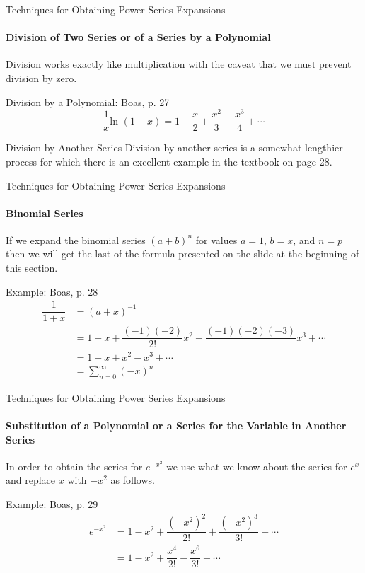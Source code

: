 \documentclass{beamer}
\begin{document}
\begin{frame}{Techniques for Obtaining Power Series Expansions}
    	\framesubtitle{Division of Two Series or of a Series by a Polynomial}
	Division works exactly like multiplication with the caveat that we must prevent division by zero.
    	\begin{exampleblock}{Division by a Polynomial: Boas, p. 27}
	\[ \dfrac{1}{x}\mbox{ln\ }(1+x) = 1 - \dfrac{x}{2} + \dfrac{x^{2}}{3} - \dfrac{x^{3}}{4} + \cdots \]
	\end{exampleblock}
	\begin{block}{Division by Another Series}
    	Division by another series is a somewhat lengthier process for which there is an excellent example in the textbook on page 28.
	\end{block}
\end{frame}
  
\begin{frame}{Techniques for Obtaining Power Series Expansions}
    	\framesubtitle{Binomial Series}
	If we expand the binomial series $(a+b)^{n}$ for values $a=1$, $b=x$, and $n=p$ then we will get the last of the formula presented on the slide at the beginning of this section.
	\begin{exampleblock}{Example: Boas, p. 28}
	\begin{align*}
	\dfrac{1}{1+x} &= (a+x)^{-1} \\
	&= 1-x+\dfrac{(-1)(-2)}{2!}x^{2}+\dfrac{(-1)(-2)(-3)}{}x^{3}+\cdots \\
	&= 1-x+x^{2}-x^{3}+\cdots \\
	&= \sum\limits_{n=0}^{\infty}(-x)^{n}
	\end{align*}
	\end{exampleblock}
\end{frame}
  
\begin{frame}{Techniques for Obtaining Power Series Expansions}
    	\framesubtitle{Substitution of a Polynomial or a Series for the Variable in Another Series}
	In order to obtain the series for $e^{-x^{2}}$ we use what we know about the series for $e^{x}$ and replace $x$ with $-x^{2}$ as follows.
	\begin{exampleblock}{Example: Boas, p. 29}
	\begin{align*}
	e^{-x^{2}} &= 1-x^{2}+\dfrac{(-x^{2})^{2}}{2!}+\dfrac{(-x^{2})^{3}}{3!}+\cdots \\
	&= 1-x^{2}+\dfrac{x^{4}}{2!}-\dfrac{x^{6}}{3!}+\cdots
	\end{align*}
	\end{exampleblock}
\end{frame}
  
\end{document}
